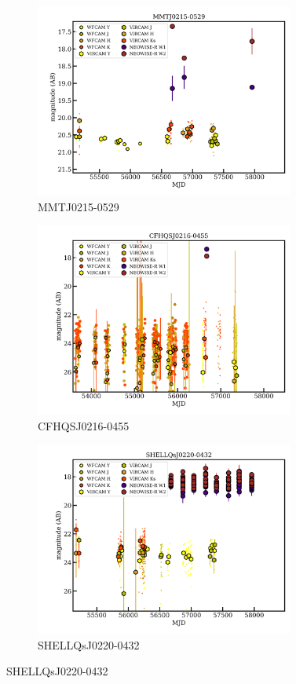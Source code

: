 \documentclass[usenatbib]{mnras}
\begin{document}
\begin{figure}[H]
  \begin{subfigure}{}
    \centering
    \includegraphics[width=8.5cm]{../light_curves/MMTJ0215-0529LC_20190214.png}
    \caption{MMTJ0215-0529}
    \label{fig:MMTJ0215-0529}
  \end{subfigure}%
  \begin{subfigure}{}
    \centering
    \includegraphics[width=8.5cm]{../light_curves/CFHQSJ0216-0455LC_20190214.png}
    \caption{CFHQSJ0216-0455}
    \label{fig:CFHQSJ0216-0455}
  \end{subfigure}
  \begin{subfigure}{}\quad
    \centering
    \includegraphics[width=8.5cm]{../light_curves/SHELLQsJ0220-0432LC_20190214.png}
    \caption{SHELLQsJ0220-0432}
    \label{fig:SHELLQsJ0220-0432}
  \end{subfigure}
  \medskip
\end{figure}
\end{document}
